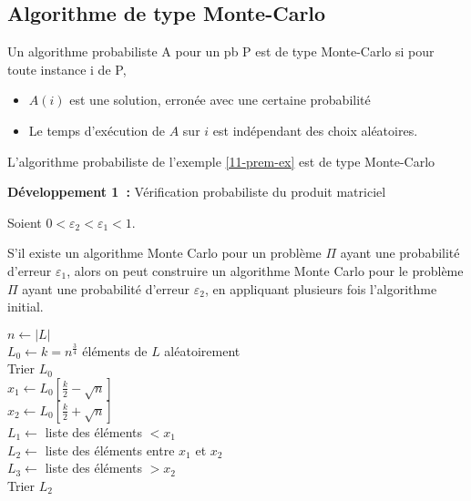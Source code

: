 \subsection{Algorithme de type Monte-Carlo}

\begin{definition}
	Un algorithme probabiliste A pour un pb P est de type Monte-Carlo si pour toute instance i de P, \begin{itemize}
		\item $A(i)$ est une solution, erronée avec une certaine probabilité
		\item Le temps d'exécution de $A$ sur $i$ est indépendant des choix aléatoires.
	\end{itemize} 
\end{definition}

\begin{example}
	L'algorithme probabiliste de l'exemple \ref{11-prem-ex} est de type Monte-Carlo
\end{example}

\textbf{Développement 1 :} Vérification probabiliste du produit matriciel

\begin{proposition}[Amplification]
    Soient $0 < \varepsilon_2 < \varepsilon_1 < 1$.
    
	S’il existe un algorithme Monte Carlo pour un problème $\Pi$ ayant une probabilité d’erreur $\varepsilon_1$, alors on peut construire un algorithme Monte Carlo pour le problème $\Pi$ ayant une probabilité d’erreur $\varepsilon_2$, en appliquant plusieurs fois l'algorithme initial.
\end{proposition}

\begin{algorithm}[H]
	\label{11-mediane}
	\caption{$mediane(L)$}
	$n \gets |L|$\\
	$L_{0} \gets k = n^{\frac{3}{4}}$ éléments de $L$ aléatoirement\\
	Trier $L_0$\\
	$x_1 \gets L_0[\frac{k}{2} - \sqrt{n}]$\\
	$x_2 \gets L_0[\frac{k}{2} + \sqrt{n}]$\\
	$L_1 \gets $ liste des éléments $< x_1$\\
	$L_2 \gets$ liste des éléments entre $x_1$ et $x_2$\\
	$L_3 \gets$ liste des éléments $> x_2$\\
	Trier $L_2$\\
\end{algorithm}

